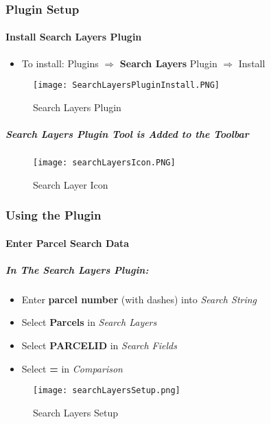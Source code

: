 \subsubsection{Plugin Setup}
\vspace{.2in}
\paragraph{Install Search Layers Plugin}
\vspace{.2in}

\vspace{.2in}

\begin{itemize}
\item To install: Plugins $\Rightarrow$ \textbf{Search Layers} Plugin $\Rightarrow$ Install
\end{itemize}
\begin{figure}[H]
\centering
     \texttt{[image: SearchLayersPluginInstall.PNG]}

\caption{Search Layers Plugin}
\end{figure}

\subparagraph{Search Layers Plugin Tool is Added to the Toolbar}
\begin{figure}[H]
\centering
     \texttt{[image: searchLayersIcon.PNG]}

\caption{Search Layer Icon}
\end{figure}

\clearpage

\subsubsection{Using the Plugin}

\paragraph*{Enter Parcel Search Data}
\vspace{.2in}

\subparagraph*{In The \textbf{Search Layers Plugin:}}
\vspace{.15in}

\begin{itemize}
\item Enter \textbf{parcel number} {\tiny (with dashes)} into \emph{Search String}
\item Select \textbf{Parcels} in \emph{Search Layers}
\item Select \textbf{PARCELID} in \emph{Search Fields}
\item Select \textbf{=} in \emph{Comparison}
\end{itemize}
\begin{figure}[H]
\centering
    \texttt{[image: searchLayersSetup.png]}
\vspace{-.1in}

\caption{Search Layers Setup}
\end{figure}

